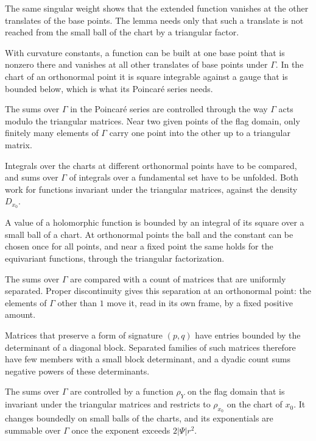 The same singular weight shows that the extended function vanishes at the other translates of the base points. The
lemma needs only that such a translate is not reached from the small ball of the chart by a triangular factor.

With curvature constants, a function can be built at one base point that is nonzero there and vanishes at all
other translates of base points under $\Gamma$. In the chart of an orthonormal point it is square integrable
against a gauge that is bounded below, which is what its Poincaré series needs.

The sums over $\Gamma$ in the Poincaré series are controlled through the way $\Gamma$ acts modulo the triangular
matrices. Near two given points of the flag domain, only finitely many elements of $\Gamma$ carry one point into
the other up to a triangular matrix.

Integrals over the charts at different orthonormal points have to be compared, and sums over $\Gamma$ of integrals
over a fundamental set have to be unfolded. Both work for functions invariant under the triangular matrices,
against the density $D_{x_0}$.

A value of a holomorphic function is bounded by an integral of its square over a small ball of a chart. At
orthonormal points the ball and the constant can be chosen once for all points, and near a fixed point the same
holds for the equivariant functions, through the triangular factorization.

The sums over $\Gamma$ are compared with a count of matrices that are uniformly separated. Proper discontinuity
gives this separation at an orthonormal point: the elements of $\Gamma$ other than $1$ move it, read in its own
frame, by a fixed positive amount.

Matrices that preserve a form of signature $(p,q)$ have entries bounded by the determinant of a diagonal block.
Separated families of such matrices therefore have few members with a small block determinant, and a dyadic count
sums negative powers of these determinants.

The sums over $\Gamma$ are controlled by a function $\rho_Y$ on the flag domain that is invariant under the
triangular matrices and restricts to $\rho_{x_0}$ on the chart of $x_0$. It changes boundedly on small balls of
the charts, and its exponentials are summable over $\Gamma$ once the exponent exceeds $2|\Psi|r^2$.

